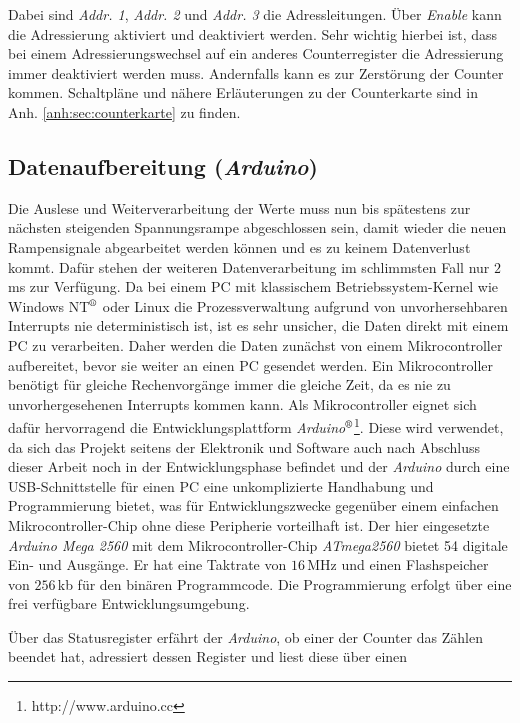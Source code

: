 Dabei sind \textit{Addr. 1}, \textit{Addr. 2} und \textit{Addr. 3} die
Adressleitungen. Über \textit{Enable} kann die Adressierung aktiviert und
deaktiviert werden. Sehr wichtig hierbei ist, dass bei einem Adressierungswechsel auf ein anderes
Counterregister die Adressierung immer deaktiviert werden muss. Andernfalls kann
es zur Zerstörung der Counter kommen. Schaltpläne und nähere Erläuterungen
zu der Counterkarte sind in Anh. \ref{anh:sec:counterkarte} zu finden.

\subsection{Datenaufbereitung (\textit{Arduino})}\label{subsec:arduino}
Die Auslese und Weiterverarbeitung der Werte muss nun bis spätestens zur
nächsten steigenden Spannungsrampe abgeschlossen sein, damit wieder die neuen
Rampensignale abgearbeitet werden können und es zu keinem Datenverlust kommt.
Dafür stehen der weiteren Datenverarbeitung im schlimmsten Fall nur $2\,$ms zur
Verfügung. Da bei einem PC mit klassischem Betriebssystem-Kernel wie Windows
NT$^\text{\textregistered}$ oder Linux die Prozessverwaltung aufgrund von
unvorhersehbaren Interrupts nie deterministisch ist, ist es sehr unsicher, die
Daten direkt mit einem PC zu verarbeiten. Daher werden die Daten zunächst von einem Mikrocontroller
aufbereitet, bevor sie weiter an einen PC gesendet werden. Ein Mikrocontroller
benötigt für gleiche Rechenvorgänge immer die gleiche Zeit, da es nie zu
unvorhergesehenen Interrupts kommen kann. Als Mikrocontroller eignet sich dafür
hervorragend die Entwicklungsplattform \textit{Arduino$^\text{\textregistered}$}\footnote{http://www.arduino.cc}. Diese
wird verwendet, da sich das Projekt seitens der Elektronik und Software
auch nach Abschluss dieser Arbeit noch in der Entwicklungsphase befindet und der
\textit{Arduino} durch eine USB-Schnittstelle für einen PC eine unkomplizierte
Handhabung und Programmierung bietet, was für Entwicklungszwecke gegenüber einem
einfachen Mikrocontroller-Chip ohne diese Peripherie vorteilhaft ist. Der hier
eingesetzte
\textit{Arduino Mega 2560} mit dem Mikrocontroller-Chip \textit{ATmega2560}
bietet 54 digitale Ein- und Ausgänge. Er hat eine Taktrate von $16\,$MHz und
einen Flashspeicher von $256\,$kb für den binären Programmcode.
Die Programmierung erfolgt über eine frei verfügbare Entwicklungsumgebung.\par
Über das Statusregister erfährt der \textit{Arduino}, ob einer der Counter das Zählen
beendet hat, adressiert dessen Register und liest diese über einen
